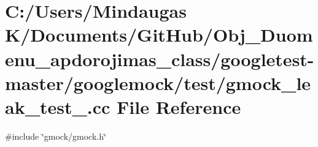 \hypertarget{googletest-master_2googlemock_2test_2gmock__leak__test___8cc}{}\section{C\+:/\+Users/\+Mindaugas K/\+Documents/\+Git\+Hub/\+Obj\+\_\+\+Duomenu\+\_\+apdorojimas\+\_\+class/googletest-\/master/googlemock/test/gmock\+\_\+leak\+\_\+test\+\_\+.cc File Reference}
\label{googletest-master_2googlemock_2test_2gmock__leak__test___8cc}
{\ttfamily \#include \char`\"{}gmock/gmock.\+h\char`\"{}}\newline
